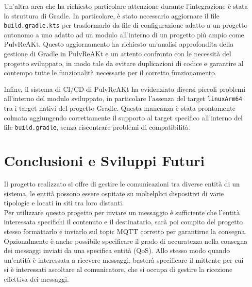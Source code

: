 \documentclass[12pt,a4paper,openright,twoside]{book}
\begin{document}
Un'altra area che ha richiesto particolare attenzione durante l'integrazione è stata la struttura di Gradle. 
In particolare, è stato necessario aggiornare il file \texttt{build.gradle.kts} per trasformarlo da file di configurazione adatto a un progetto autonomo a uno adatto ad un 
modulo all'interno di un progetto più ampio come PulvReAKt. Questo aggiornamento ha richiesto un'analisi approfondita della gestione di Gradle in PulvReAKt e un attento confronto 
con le necessità del progetto sviluppato, in modo tale da evitare duplicazioni di codice e garantire al contempo tutte le funzionalità necessarie per il corretto funzionamento.

Infine, il sistema di \ac{CI/CD} di PulvReAKt ha evidenziato diversi piccoli problemi all'interno del modulo sviluppato,
in particolare l'assenza del target \texttt{linuxArm64} tra i target nativi del progetto Gradle. 
Questa mancanza è stata prontamente colmata aggiungendo correttamente il supporto al target specifico all'interno del file \texttt{build.gradle}, 
senza riscontrare problemi di compatibilità.

\chapter{Conclusioni e Sviluppi Futuri}\label{chap:Conclusioni}

Il progetto realizzato si offre di gestire le comunicazioni tra diverse entità di un sistema, le entità possono essere ospitate su moltelplici dispositivi 
di varie tipologie e locati in siti tra loro distanti.\\
Per utilizzare questo progetto per inviare un messaggio è sufficiente che l'entità interessata specifichi il contenuto e il destinatario,
sarà poi compito del progetto stesso formattarlo e inviarlo sul topic \ac{MQTT} corretto per garantirne la consegna. 
Opzionalmente è anche possibile specificare il grado di accuratezza nella consegna dei messaggi inviati da una specifica entità (\ac{QoS}).
Allo stesso modo quando un'entità è interessata a ricevere messaggi, basterà specificare il mittente per cui si è interessati ascoltare al comunicatore, 
che si occupa di gestire la ricezione effettiva dei messaggi.\\
\end{document}
